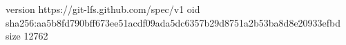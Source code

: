 version https://git-lfs.github.com/spec/v1
oid sha256:aa5b8fd790bff673ee51acdf09ada5dc6357b29d8751a2b53ba8d8e20933efbd
size 12762
